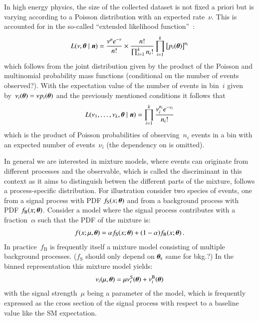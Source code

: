 In high energy physics, the size of the collected dataset is not fixed
a priori but is varying according to a Poisson distribution with an
expected rate~$\nu$. This is accounted for in the so-called ``extended
likelihood function''~\cite{cowan1998}:
\begin{align*}
  L(\nu, \boldtheta \mid \boldn) =
  \frac{\nu^n e^{-\nu}}{n!} \times \frac{n!}
  {\prod_{i = 1}^k n_{i}!}
  \prod_{i = 1}^k \left[ p_i(\boldtheta) \right]^{n_i}
\end{align*}
which follows from the joint distribution given by the product of the
Poisson and multinomial probability mass functions (conditional on the
number of events observed?).  With the expectation value of the number
of events in bin~$i$ given
by~$\nu_i(\boldtheta) = \nu p_i(\boldtheta)$ and the previously
mentioned conditions it follows that
\begin{align*}
  L(\nu_1, \dots, \nu_k, \boldtheta \mid \boldn) = \prod_{i = 1}^k \frac{\nu_i^{n_i} e^{-\nu_i}}{n_i!}
\end{align*}
which is the product of Poisson probabilities of observing~$n_i$
events in a bin with an expected number of events~$\nu_i$ (the
dependency on \boldtheta is omitted).


In general we are interested in mixture models, where events can
originate from different processes and the observable, which is called
the discriminant in this context as it aims to distinguish betwen the
different parts of the mixture, follows a process-specific
distribution. For illustration consider two species of events, one
from a signal process with PDF $f_\text{S}(x; \boldtheta)$ and from a
background process with PDF $f_\text{B}(x; \boldtheta)$. Consider a
model where the signal process contributes with a fraction~$\alpha$
such that the PDF of the mixture is:
\begin{align*}
  f(x; \mu, \boldtheta) = \alpha f_\text{S}(x; \boldtheta) + (1 - \alpha) f_\text{B}(x; \boldtheta) \,\text{.}
\end{align*}
In practice~$f_\text{B}$ is frequently itself a mixture model
consisting of multiple background processes. ($f_\text{S}$ should only
depend on $\boldtheta_\text{s}$ same for bkg.?) In the binned representation this
mixture model yields:
\begin{align*}
  \nu_i(\mu, \boldtheta) = \mu \nu_i^\text{S}(\boldtheta) + \nu_i^\text{B}(\boldtheta)
\end{align*}
with the signal strength~$\mu$ being a parameter of the model, which
is frequently expressed as the cross section of the signal process
with respect to a baseline value like the SM expectation.

